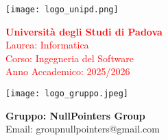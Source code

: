\begin{minipage}{0.4\textwidth}
    \texttt{[image: logo\_unipd.png]}
\end{minipage}
\begin{minipage}{0.55\textwidth}
    \textcolor{red}{\textbf{Università degli Studi di Padova}} \\
    \textcolor{red}{Laurea: Informatica} \\
    \textcolor{red}{Corso: Ingegneria del Software} \\
    \textcolor{red}{Anno Accademico: 2025/2026}
\end{minipage}

\begin{minipage}{0.4\textwidth}
    \texttt{[image: logo\_gruppo.jpeg]}
\end{minipage}
\begin{minipage}{0.55\textwidth}
    \textbf{Gruppo: NullPointers Group} \\
    Email: \textsf{groupnullpointers@gmail.com}
\end{minipage}

\vspace{2cm}